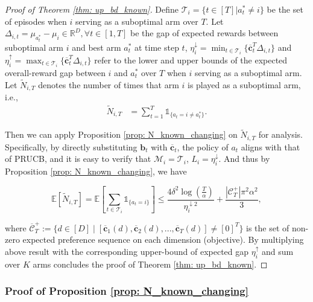 \begin{proof}[Proof of Theorem \ref{thm: up_bd_known}]

Define $\mathcal{T}_{i} = \{ t \in [T] | a^*_t \neq i \}$ be the set of episodes when $i$ serving as a suboptimal arm over $T$.
Let 
$\Delta_{i,t} = \mu_{a_{t}^{*}} - \mu_{i} \in \mathbb{R}^D, \forall t \in [1,T]$ 
be the gap of expected rewards between suboptimal arm $i$ and best arm $a_t^*$ at time step $t$, 
$\eta_{i}^{\downarrow} = \min_{t \in \mathcal{T}_{i}}\{\boldsymbol{\overline{c}}_{t}^{T} \Delta_{i,t} \}$ and 
$\eta_{i}^{\uparrow} = \max_{t \in \mathcal{T}_{i}}\{\boldsymbol{\overline{c}}_{t}^{T} \Delta_{i,t} \}$ refer to the lower and upper bounds of the expected overall-reward gap between $i$ and $a_t^*$ over $T$ when $i$ serving as a suboptimal arm.
Let $\tilde{N}_{i,T}$ denotes the number of times that arm $i$ is played as a suboptimal arm, i.e.,
\[
\begin{aligned}
\tilde{N}_{i,T} &= \sum_{t=1}^{T} \mathds{1}_{\{a_t = i \neq a^*_t\}}.
\end{aligned}
\]

Then we can apply Proposition \ref{prop: N_known_changing} on $\tilde{N}_{i,T}$ for analysis. 
Specifically, by directly substituting $\boldsymbol{b}_t$ with $\boldsymbol{\overline{c}}_t$, the policy of $a_t$ aligns with that of PRUCB, and it is easy to verify that $\mathcal{M}_i = \mathcal{T}_i$, $L_i = \eta_{i}^{\downarrow}$. And thus by Proposition \ref{prop: N_known_changing}, we have

\[
\mathbb{E} [\tilde{N}_{i,T}] 
=
\mathbb{E} \left[ \sum_{t \in \mathcal{T}_i} \mathds{1}_{\{a_t = i \} } \right] 
\leq
\frac{4 \delta^2 \log{(\frac{T}{\alpha})}}{\eta_{i}^{\downarrow 2}}
+
\frac{|\mathcal{C}^{+}_{T}| \pi^2 \alpha^2} {3},
\]

where $\mathcal{\overline{C}}^{+}_{T}:= \{ d \in [D] \mid {[\boldsymbol{\overline{c}}_{1}(d), \boldsymbol{\overline{c}}_{2}(d), ..., \boldsymbol{\overline{c}}_{T}(d)]} \neq [0]^T \}$ is the set of non-zero expected preference sequence on each dimension (objective).
By multiplying above result with the corresponding upper-bound of expected gap $\eta_{i}^{\uparrow}$ and sum over $K$ arms concludes the proof of Theorem \ref{thm: up_bd_known}.
\end{proof} 


\subsubsection{Proof of Proposition \ref{prop: N_known_changing}}
\label{sec: app_pr_prop_N_known_changing}

